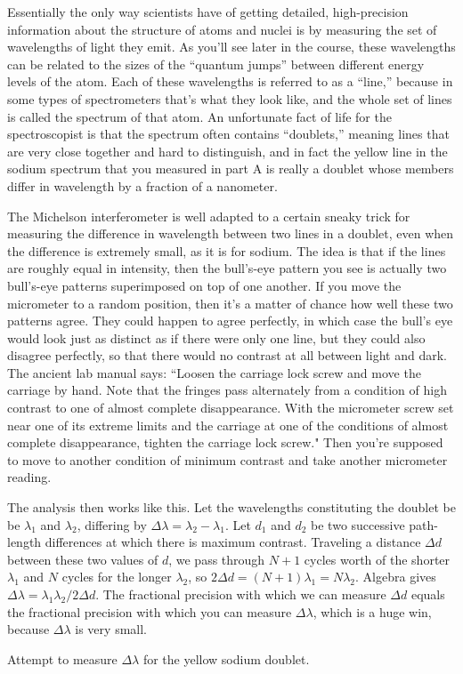 
Essentially the only way scientists have of getting detailed, high-precision information
about the structure of atoms and nuclei is by measuring the set of wavelengths of light
they emit. As you'll see later in the course, these wavelengths can be related to the sizes
of the ``quantum jumps'' between different energy levels of the atom. Each of these wavelengths
is referred to as a ``line,'' because in some types of spectrometers that's what they look like,
and the whole set of lines is called the spectrum of that atom.
An unfortunate fact of life for the spectroscopist is that the spectrum often contains ``doublets,''
meaning lines that are very close together and hard to distinguish, and in fact the yellow line
in the sodium spectrum that you measured in part A is really a doublet whose members differ
in wavelength by a fraction of a nanometer.

The Michelson interferometer
is well adapted to a certain sneaky trick for measuring the difference in wavelength
between two lines in a doublet, even when the difference is extremely small, as it is for
sodium. The idea is that if the lines are roughly equal in intensity, then the bull's-eye pattern
you see is actually two bull's-eye patterns superimposed on top of one another. If you move
the micrometer to a random position, then it's a matter of chance how well these two patterns
agree. They could happen to agree perfectly, in which case the bull's eye would look just as distinct
as if there were only one line, but they could also disagree perfectly, so that there would no
contrast at all between light and dark. The ancient lab manual says: 
            ``Loosen the carriage lock screw and move the carriage by hand. Note that the fringes
            pass alternately from a condition of high contrast to one of almost complete
            disappearance. With the micrometer screw set near one of its extreme limits
            and the carriage at one of the conditions of almost complete disappearance,
            tighten the carriage lock screw." 
Then you're supposed to move to another condition of minimum
            contrast and take another micrometer reading.

The analysis then works like this. Let the wavelengths constituting the doublet be
be $\lambda_1$ and $\lambda_2$, differing by $\Delta \lambda = \lambda_2-\lambda_1$.
Let $d_1$ and $d_2$ be two successive path-length differences at which there is maximum
          contrast. Traveling a distance $\Delta d$
          between these two values of $d$, we pass through $N+1$ cycles worth of the shorter
          $\lambda_1$ and $N$ cycles  for the longer $\lambda_2$, so
          $2 \Delta d = (N+1) \lambda_1=N \lambda_2$. Algebra gives
          $\Delta \lambda=\lambda_1 \lambda_2/2 \Delta d$.
    The fractional precision with which we can measure $\Delta d$ equals the fractional
           precision with which you can measure $\Delta \lambda$, which is a huge win,
           because $\Delta \lambda$ is very small.

Attempt to measure $\Delta \lambda$ for the yellow sodium doublet.
